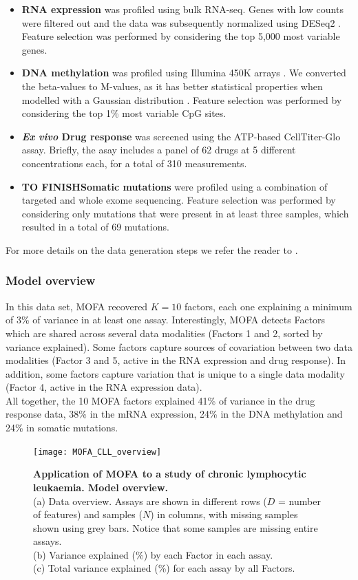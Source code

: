\begin{itemize}
	\item \textbf{RNA expression} was profiled using bulk RNA-seq. Genes with low counts were filtered out and the data was subsequently normalized using DESeq2 \cite{Love2014}. Feature selection was performed by considering the top 5,000 most variable genes.
	\item \textbf{DNA methylation} was profiled using Illumina 450K arrays \cite{XXX}. We converted the beta-values to M-values, as it has better statistical properties when modelled with a Gaussian distribution \cite{XXX}. Feature selection was performed by considering the top 1\% most variable CpG sites. 
	\item \textbf{\textit{Ex vivo} Drug response} was screened using the ATP-based CellTiter-Glo assay. Briefly, the asay includes a panel of 62 drugs at 5 different concentrations each, for a total of 310 measurements. 

	\item \textbf{TO FINISHSomatic mutations} were profiled using a combination of targeted and whole exome sequencing. Feature selection was performed by considering only mutations that were present in at least three samples, which resulted in a total of 69 mutations.
\end{itemize}

For more details on the data generation steps we refer the reader to \cite{Dietrich2018}.

\subsubsection{Model overview}

In this data set, MOFA recovered $K=10$ factors, each one explaining a minimum of 3\% of variance in at least one assay. Interestingly, MOFA detects Factors which are shared across several data modalities (Factors 1 and 2, sorted by variance explained). Some factors capture sources of covariation between two data modalities (Factor 3 and 5, active in the RNA expression and drug response). In addition, some factors capture variation that is unique to a single data modality (Factor 4, active in the RNA expression data).\\
All together, the 10 MOFA factors explained 41\% of variance in the drug response data, 38\% in the mRNA expression, 24\% in the DNA methylation and 24\% in somatic mutations.

\begin{figure}[H]
	\centering 	
	\texttt{[image: MOFA\_CLL\_overview]}
	\caption{\textbf{Application of MOFA to a study of chronic lymphocytic leukaemia. Model overview.}\\
	(a) Data overview. Assays are shown in different rows ($D$ = number of features) and samples ($N$) in columns, with missing samples shown using grey bars. Notice that some samples are missing entire assays.\\
	(b) Variance explained (\%) by each Factor in each assay.\\
	(c) Total variance explained (\%) for each assay by all Factors.
	}
	\label{fig:MOFA_CLL_overview}
\end{figure}

